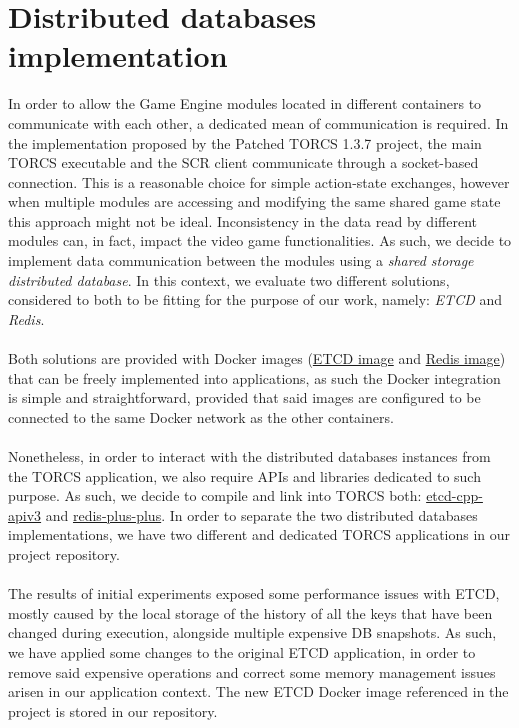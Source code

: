 \section{Distributed databases implementation}
In order to allow the Game Engine modules located in different containers to communicate with each other, a dedicated mean of communication is required. In the implementation proposed by the Patched TORCS 1.3.7 project, the main TORCS executable and the SCR client communicate through a socket-based connection. This is a reasonable choice for simple action-state exchanges, however when multiple modules are accessing and modifying the same shared game state this approach might not be ideal. Inconsistency in the data read by different modules can, in fact, impact the video game functionalities. As such, we decide to implement data communication between the modules using a \textit{shared storage distributed database}. In this context, we evaluate two different solutions, considered to both to be fitting for the purpose of our work, namely: \textit{ETCD} and \textit{Redis}. \\ \\
Both solutions are provided with Docker images (\href{https://hub.docker.com/r/bitnami/etcd}{ETCD image} and \href{https://hub.docker.com/_/redis}{Redis image}) that can be freely implemented into applications, as such the Docker integration is simple and straightforward, provided that said images are configured to be connected to the same Docker network as the other containers. \\ \\
Nonetheless, in order to interact with the distributed databases instances from the TORCS application, we also require APIs and libraries dedicated to such purpose. As such, we decide to compile and link into TORCS both: \href{https://github.com/etcd-cpp-apiv3/etcd-cpp-apiv3}{etcd-cpp-apiv3} and \href{https://github.com/sewenew/redis-plus-plus}{redis-plus-plus}. In order to separate the two distributed databases implementations, we have two different and dedicated TORCS applications in our project repository. \\ \\
The results of initial experiments exposed some performance issues with ETCD, mostly caused by the local storage of the history of all the keys that have been changed during execution, alongside multiple expensive DB snapshots. As such, we have applied some changes to the original ETCD application, in order to remove said expensive operations and correct some memory management issues arisen in our application context. The new ETCD Docker image referenced in the project is stored in our repository.

